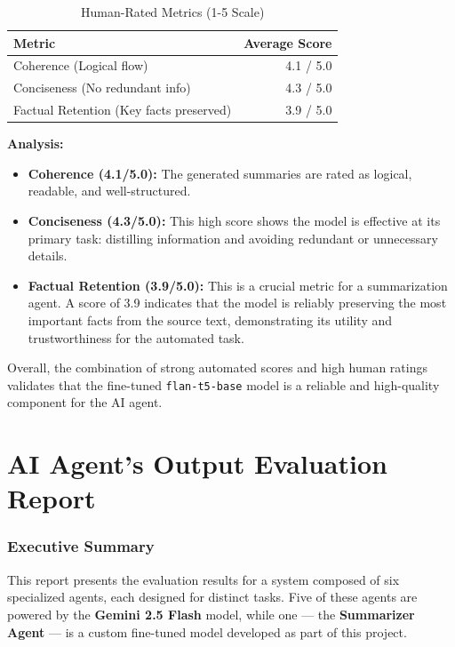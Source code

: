 \documentclass[12pt,a4paper]{article}
\begin{document}
\begin{table}[H]
\centering
\caption{Human-Rated Metrics (1-5 Scale)}
\label{tab:human-metrics}
\begin{tabular}{lr}
\toprule
\textbf{Metric} & \textbf{Average Score} \\
\midrule
Coherence (Logical flow) & 4.1 / 5.0 \\
Conciseness (No redundant info) & 4.3 / 5.0 \\
Factual Retention (Key facts preserved) & 3.9 / 5.0 \\
\bottomrule
\end{tabular}
\end{table}

\textbf{Analysis:}
\begin{itemize}
    \item \textbf{Coherence (4.1/5.0):} The generated summaries are rated as logical, readable, and well-structured.
    \item \textbf{Conciseness (4.3/5.0):} This high score shows the model is effective at its primary task: distilling information and avoiding redundant or unnecessary details.
    \item \textbf{Factual Retention (3.9/5.0):} This is a crucial metric for a summarization agent. A score of 3.9 indicates that the model is reliably preserving the most important facts from the source text, demonstrating its utility and trustworthiness for the automated task.
\end{itemize}

Overall, the combination of strong automated scores and high human ratings validates that the fine-tuned \texttt{flan-t5-base} model is a reliable and high-quality component for the AI agent.

\clearpage %

\part{AI Agent's Output Evaluation Report}

\section{Executive Summary}
This report presents the evaluation results for a system composed of six specialized agents, each designed for distinct tasks. Five of these agents are powered by the \textbf{Gemini 2.5 Flash} model, while one — the \textbf{Summarizer Agent} — is a custom fine-tuned model developed as part of this project.
\end{document}
